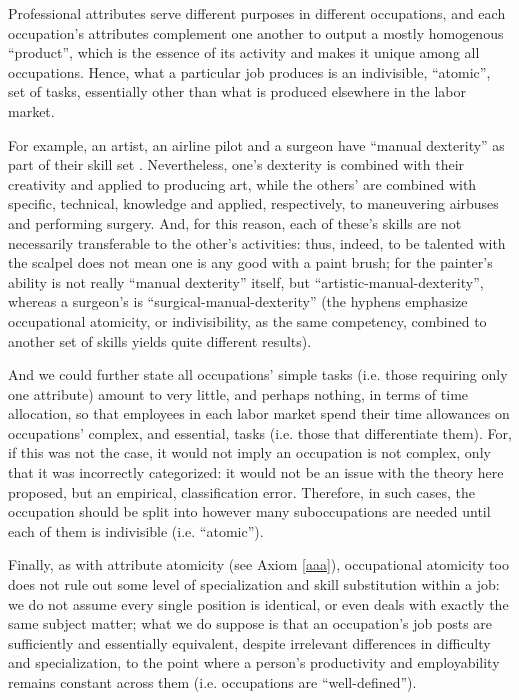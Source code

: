 \documentclass[hidelinks, nonatbib]{elsarticle}
\begin{document}
\begin{observation}
    \label{oao}
    Professional attributes serve different purposes in different occupations, and each occupation's attributes complement one another to output a mostly homogenous ``product'', which is the essence of its activity and makes it unique among all occupations. Hence, what a particular job produces is an indivisible, ``atomic'', set of tasks, essentially other than what is produced elsewhere in the labor market.
\end{observation}

For example, an artist, an airline pilot and a surgeon have ``manual dexterity'' as part of their skill set \parencite[][]{onet_art,onet_pilot,onet_surgeon}. Nevertheless, one's dexterity is combined with their creativity and applied to producing art, while the others' are combined with specific, technical, knowledge and applied, respectively, to maneuvering airbuses and performing surgery. And, for this reason, each of these's skills are not necessarily transferable to the other's activities: thus, indeed, to be talented with the scalpel does not mean one is any good with a paint brush; for the painter's ability is not really ``manual dexterity'' itself, but ``artistic-manual-dexterity'', whereas a surgeon's is ``surgical-manual-dexterity'' (the hyphens emphasize occupational atomicity, or indivisibility, as the same competency, combined to another set of skills yields quite different results).

And we could further state all occupations' simple tasks (i.e. those requiring only one attribute) amount to very little, and perhaps nothing, in terms of time allocation, so that employees in each labor market spend their time allowances on occupations' complex, and essential, tasks (i.e. those that differentiate them). For, if this was not the case, it would not imply an occupation is not complex, only that it was incorrectly categorized: it would not be an issue with the theory here proposed, but an empirical, classification error. Therefore, in such cases, the occupation should be split into however many suboccupations are needed until each of them is indivisible (i.e. ``atomic'').

Finally, as with attribute atomicity (see Axiom \ref{aaa}), occupational atomicity too does not rule out some level of specialization and skill substitution within a job: we do not assume every single position is identical, or even deals with exactly the same subject matter; what we do suppose is that an occupation's job posts are sufficiently and essentially equivalent, despite irrelevant differences in difficulty and specialization, to the point where a person's productivity and employability remains constant across them (i.e. occupations are ``well-defined'').
\end{document}
